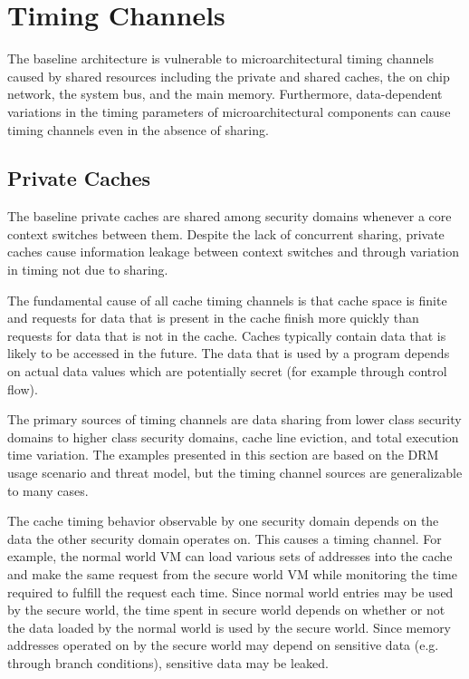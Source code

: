 \section{Timing Channels}
The baseline architecture is vulnerable to microarchitectural timing channels 
caused by shared resources including the private and shared caches, the on chip 
network, the system bus, and the main memory. Furthermore, data-dependent 
variations in the timing parameters of microarchitectural components can cause 
timing channels even in the absence of sharing.

\subsection{Private Caches}
The baseline private caches are shared among security domains whenever a core 
context switches between them. Despite the lack of concurrent sharing, private 
caches cause information leakage between context switches and through variation 
in timing not due to sharing. 

The fundamental cause of all cache timing channels is that cache space is 
finite and requests for data that is present in the cache finish more quickly 
than requests for data that is not in the cache. Caches typically contain data 
that is likely to be accessed in the future. The data that is used by a program 
depends on actual data values which are potentially secret (for example through 
control flow). 

The primary sources of timing channels are data sharing from lower class 
security domains to higher class security domains, cache line eviction, and 
total execution time variation. The examples presented in this section are 
based on the DRM usage scenario and threat model, but the timing channel 
sources are generalizable to many cases.

The cache timing behavior observable by one security domain depends on the data 
the other security domain operates on. This causes a timing channel. For 
example, the normal world VM can load various sets of addresses into the cache 
and make the same request from the secure world VM while monitoring the time 
required to fulfill the request each time.  Since normal world entries may be 
used by the secure world, the time spent in secure world depends on whether or 
not the data loaded by the normal world is used by the secure world.
Since memory addresses operated on by the secure world may depend on sensitive 
data (e.g. through branch conditions), sensitive data may be leaked. 

